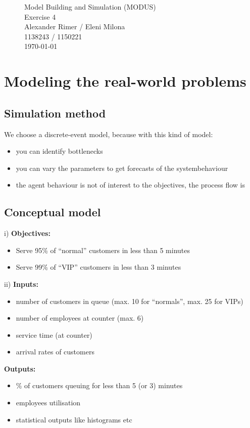 \begin{figure}
\centering
{\Huge Model Building and Simulation (MODUS)}\\[0.5cm]
{\Huge Exercise 4}\\[0.5cm]
{\Large Alexander Rimer / Eleni Milona}\\[0.6cm]  
{\Large 1138243 / 1150221}\\[0.6cm]  
\today
\end{figure}

\section{Modeling the real-world problems}
\subsection{Simulation method}
We choose a discrete-event model, because with this kind of model:
\begin{itemize}
  	\item you can identify bottlenecks
	\item	you can vary the parameters to get forecasts of the systembehaviour
	\item	the agent behaviour is not of interest to the objectives, the process flow is
\end{itemize}

\subsection{Conceptual model}
i) 
	\textbf{Objectives:}
		\begin{itemize}	
		  \item Serve 95\% of ``normal'' customers in less than 5 minutes
		  \item Serve 99\% of ``VIP'' customers in less than 3 minutes
		\end{itemize}
ii) 	
	\textbf{Inputs:}
		\begin{itemize}	
		  \item number of customers in queue (max. 10 for ``normals'', max. 25 for VIPs)
		  \item number of employees at counter  (max. 6)
		  \item service time (at counter)
		  \item arrival rates of customers
		\end{itemize}
		
	\textbf{Outputs:}
		\begin{itemize}	
		  \item \% of customers queuing for less than 5 (or 3) minutes
		  \item employees utilisation
		  \item statistical outputs like histograms etc
		\end{itemize}
		
